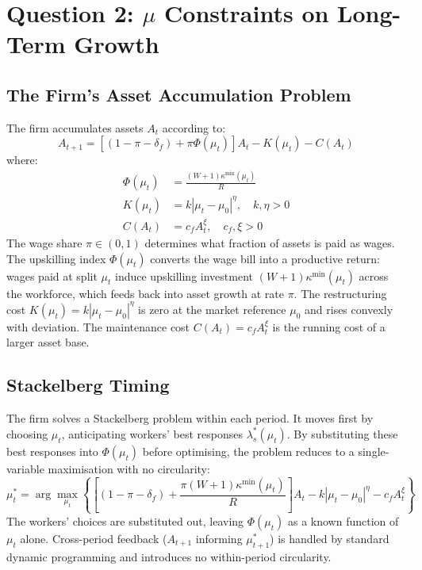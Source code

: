 \documentclass[12pt,a4paper]{article}
\begin{document}
\section{Question 2: $\mu$ Constraints on Long-Term Growth}
\label{sec:firm}

\subsection{The Firm's Asset Accumulation Problem}

The firm accumulates assets $A_t$ according to:
\begin{equation}
  A_{t+1} = \left[(1-\pi-\delta_f) + \pi\Phi(\mu_t)\right]A_t
             - K(\mu_t) - C(A_t)
  \label{eq:firm_lom}
\end{equation}
where:
\begin{align}
  \Phi(\mu_t) &= \frac{(W+1)\kappa^{\min}(\mu_t)}{R}
  \label{eq:Phi_lom} \\[4pt]
  K(\mu_t) &= k|\mu_t - \mu_0|^\eta, \quad k,\eta > 0
  \label{eq:Kcost} \\[4pt]
  C(A_t) &= c_f A_t^\xi, \quad c_f,\xi > 0
  \label{eq:Ccost}
\end{align}
The wage share $\pi \in (0,1)$ determines what fraction of assets is
paid as wages. The upskilling index $\Phi(\mu_t)$ converts the wage
bill into a productive return: wages paid at split $\mu_t$ induce
upskilling investment $(W+1)\kappa^{\min}(\mu_t)$ across the workforce,
which feeds back into asset growth at rate $\pi$. The restructuring
cost $K(\mu_t) = k|\mu_t-\mu_0|^\eta$ is zero at the market reference
$\mu_0$ and rises convexly with deviation. The maintenance cost
$C(A_t) = c_f A_t^\xi$ is the running cost of a larger asset base.

\subsection{Stackelberg Timing}

The firm solves a Stackelberg problem within each period. It moves
first by choosing $\mu_t$, anticipating workers' best responses
$\lambda_s^*(\mu_t)$. By substituting these best responses into
$\Phi(\mu_t)$ before optimising, the problem reduces to a
single-variable maximisation with no circularity:
\begin{equation}
  \mu_t^* = \arg\max_{\mu_t} \left\{
    \left[(1-\pi-\delta_f) + \frac{\pi(W+1)\kappa^{\min}(\mu_t)}{R}\right]A_t
    - k|\mu_t-\mu_0|^\eta - c_f A_t^\xi
  \right\}
  \label{eq:firm_opt}
\end{equation}
The workers' choices are substituted out, leaving $\Phi(\mu_t)$ as a
known function of $\mu_t$ alone. Cross-period feedback ($A_{t+1}$
informing $\mu_{t+1}^*$) is handled by standard dynamic programming
and introduces no within-period circularity.
\end{document}
